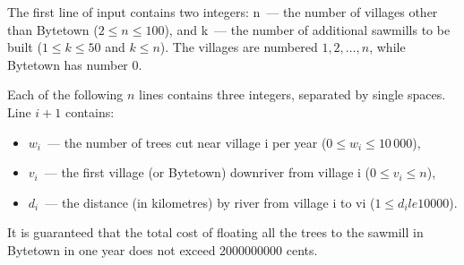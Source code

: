 The first line of input contains two integers: n~--- the number of villages other than Bytetown ($2 \le n \le 100$),
and k~--- the number of additional sawmills to be built ($1 \le k \le 50$ and $k \le n$). The villages are numbered
$1, 2, \ldots, n$, while Bytetown has number 0.

Each of the following $n$ lines contains three integers, separated by single spaces. Line $i + 1$ contains:

\begin{itemize}
\item $w_i$~--- the number of trees cut near village i per year ($0 \le w_i \le 10\,000$),
\item $v_i$~--- the first village (or Bytetown) downriver from village i ($0 \le v_i \le n$),
\item $d_i$~--- the distance (in kilometres) by river from village i to vi ($1 \le d_i le 10000$).
\end{itemize}

It is guaranteed that the total cost of floating all the trees to the sawmill in Bytetown in one year does not
exceed 2000000000 cents.
